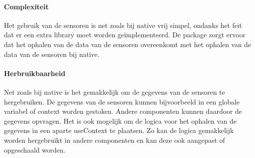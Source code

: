 \paragraph{Complexiteit}
Het gebruik van de sensoren is net zoals bij native vrij simpel, ondanks het feit dat er een extra library moet worden
geïmplementeerd. De package zorgt ervoor dat het ophalen van de data van de sensoren overeenkomt met het 
ophalen van de data van de sensoren bij native. 

\paragraph{Herbruikbaarheid}
Net zoals bij native is het gemakkelijk om de gegevens van de sensoren te hergebruiken. De gegevens van de sensoren 
kunnen bijvoorbeeld in een globale variabel of context worden gestoken. Andere componenten kunnen daardoor de gegevens 
opvragen. Het is ook mogelijk om de logica voor het ophalen van de gegevens
in een aparte useContext te plaatsen. Zo kan de logica gemakkelijk worden hergebruikt in andere 
componenten en kan deze ook aangepast of opgeschaald worden. 
